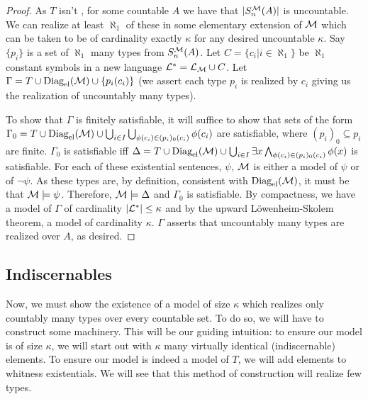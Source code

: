 \begin{proof}
As \(T\) isn't \omst, for some countable \(A\) we have that \(|S_n^{\mathcal{M}}(A)|\) is uncountable. 
We can realize at least \(\aleph_1\) of these in some elementary extension of \(\mathcal{M}\) which can be taken to be of cardinality exactly \(\kappa\) for any desired uncountable \(\kappa\).
Say \(\{p_i\}\) is a set of \(\aleph_1\) many types from \(S_n^{\mathcal{M}}(A)\).
Let \(C = \{c_i| i \in \aleph_1\} \) be \(\aleph_1\) constant symbols in a new language \(\mathcal{L}^* = \mathcal{L}_{\mathcal{M}} \cup C\). 
Let \(\Gamma = T \cup \text{Diag}_\text{el}(\mathcal{M}) \cup \{p_i(c_i)\}\) (we assert each type \(p_i\) is realized by \(c_i\) giving us the realization of uncountably many types).
 
To show that \(\Gamma\) is finitely satisfiable, it will suffice to show that sets of the form \(\Gamma_0 = T \cup \text{Diag}_\text{el}(\mathcal{M}) \cup \bigcup_{i \in I}\bigcup_{\phi(c_i) \in (p_i)_0(c_i)} \phi(c_i)\) are satisfiable, where \((p_i)_0 \subseteq p_i\) are finite.  
\(\Gamma_0\) is satisfiable iff \(\Delta = T \cup \text{Diag}_\text{el}(\mathcal{M}) \cup \bigcup_{i \in I}\exists x \bigwedge_{\phi(c_i) \in (p_i)_0(c_i)} \phi(x)\) is satisfiable.
For each of these existential sentences, \(\psi\), \(\mathcal{M}\) is either a model of \(\psi\) or of \(\neg \psi\). 
As these types are, by definition, consistent with \(\text{Diag}_\text{el}(\mathcal{M})\), it must be that \(\mathcal{M} \models \psi\). 
Therefore, \(\mathcal{M} \models \Delta\) and \(\Gamma_0\) is satisfiable. 
By compactness, we have a model of \(\Gamma\) of cardinality \(|\mathcal{L}^*| \leq \kappa\) and by the upward L\"owenheim-Skolem theorem, a model of cardinality \(\kappa\).
\(\Gamma\) asserts that uncountably many types are realized over \(A\), as desired. 
\end{proof}

\subsection{Indiscernables}
Now, we must show the existence of a model of size \(\kappa\) which realizes only countably many types over every countable set. 
To do so, we will have to construct some machinery.
This will be our guiding intuition: to ensure our model is of size \(\kappa\), we will start out with \(\kappa\) many virtually identical (indiscernable) elements. 
To ensure our model is indeed a model of \(T\), we will add elements to whitness existentials. 
We will see that this method of construction will realize few types.

